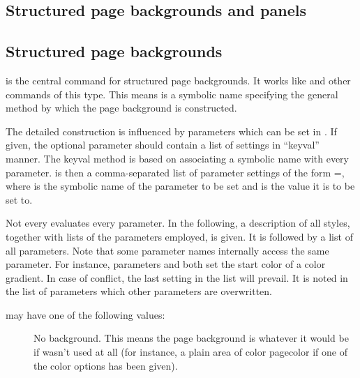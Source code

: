 \begin{slide}
  \newslide


  \section{Structured page backgrounds and panels}\label{Sec:PageBackPanel}
  \subsection{Structured page backgrounds}

  is the central command for structured page backgrounds. It works like
   and other commands of this type. This means
   is a symbolic name specifying the general method by which the
  page background is constructed.

  The detailed construction is influenced by parameters which can be set in
  . If given, the optional parameter  should
  contain a list of settings in ``keyval'' manner. The keyval method
  is based on associating a symbolic name with every parameter. 
  is then a comma-separated list of parameter settings of the form
  =, where  is the symbolic name of the
  parameter to be set and  is the value it is to be set to.

  Not every  evaluates every parameter. In the following, a
  description of all styles, together with lists of the parameters employed, is
  given. It is followed by a list of all parameters. Note that some parameter
  names internally access the same parameter. For instance, parameters
   and  both set the start color of a color
  gradient. In case of conflict, the last setting in the list 
  will prevail. It is noted in the list of parameters which other parameters
  are overwritten.

  \newslide

   may have one of the following values:
  \begin{description}
  \item[]
    No background. This means the page background is whatever it would be if
     wasn't used at all (for instance, a plain area
    of color pagecolor if one of the color options has been given).


\end{description}
\end{slide}
